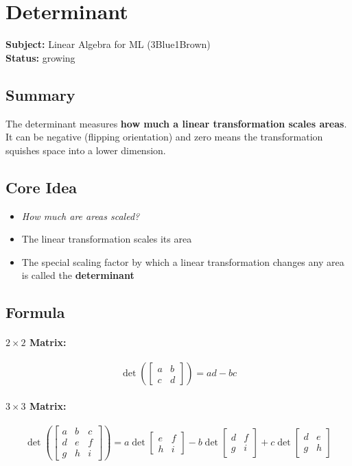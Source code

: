\section{Determinant}
\label{sec:determinant}

\noindent\textbf{Subject:} Linear Algebra for ML (3Blue1Brown) \\
\textbf{Status:} growing

\subsection*{Summary}
The determinant measures \textbf{how much a linear transformation scales areas}. It can be negative (flipping orientation) and zero means the transformation squishes space into a lower dimension.

\subsection{Core Idea}
\begin{itemize}[nosep]
  \item \emph{How much are areas scaled?}
  \item The linear transformation scales its area
  \item The special scaling factor by which a linear transformation changes any area is called the \textbf{determinant}
\end{itemize}

\subsection{Formula}

\paragraph{$2\times2$ Matrix:}
\[
\det\left(\begin{bmatrix} a & b \\ c & d \end{bmatrix}\right) = ad - bc
\]

\paragraph{$3\times3$ Matrix:}
\[
\det\left(\begin{bmatrix} a & b & c \\ d & e & f \\ g & h & i \end{bmatrix}\right)
= a \det\begin{bmatrix} e & f \\ h & i \end{bmatrix}
- b \det\begin{bmatrix} d & f \\ g & i \end{bmatrix}
+ c \det\begin{bmatrix} d & e \\ g & h \end{bmatrix}
\]

